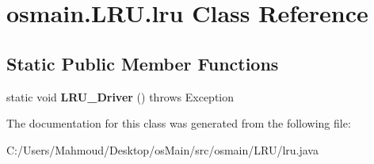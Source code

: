 \hypertarget{classosmain_1_1_l_r_u_1_1lru}{}\section{osmain.\+L\+R\+U.\+lru Class Reference}
\label{classosmain_1_1_l_r_u_1_1lru}
\subsection*{Static Public Member Functions}
\begin{DoxyCompactItemize}
\item 
static void {\bfseries L\+R\+U\+\_\+\+Driver} ()  throws Exception      \hypertarget{classosmain_1_1_l_r_u_1_1lru_a8efe95b3fadd1cc3eda82f4993979d5a}{}\label{classosmain_1_1_l_r_u_1_1lru_a8efe95b3fadd1cc3eda82f4993979d5a}

\end{DoxyCompactItemize}


The documentation for this class was generated from the following file\+:\begin{DoxyCompactItemize}
\item 
C\+:/\+Users/\+Mahmoud/\+Desktop/os\+Main/src/osmain/\+L\+R\+U/lru.\+java\end{DoxyCompactItemize}
